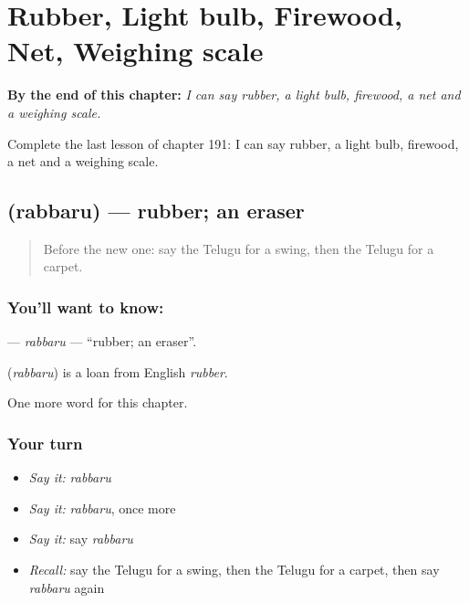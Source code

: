 
\chapter{Rubber, Light bulb, Firewood, Net, Weighing scale}
\label{ch:te-rubber-light-bulb-firewood-net-weighing-scale}

\begin{chapteropening}
\textbf{By the end of this chapter:} \emph{I can say rubber, a light bulb, firewood, a net and a weighing scale.}

Complete the last lesson of chapter 191: I can say rubber, a light bulb, firewood, a net and a weighing scale.
\end{chapteropening}

\section[\texorpdfstring{\te{రబ్బరు} (rabbaru)}{రబ్బరు (rabbaru)}]{ (rabbaru) — rubber; an eraser}

\label{lesson:TE-C191-rabbaru}



\begin{quote}
Before the new one: say the Telugu for a swing, then the Telugu for a carpet.
\end{quote}

\subsection*{You'll want to know: }
\textbf{} — \emph{rabbaru} — \textquotedblleft{}rubber; an eraser\textquotedblright{}.

\begin{cousinweb}
\textbf{} (\emph{rabbaru}) is a loan from English \emph{rubber}.
\end{cousinweb}

\begin{grammarlens}[title={What you've built}]
One more word for this chapter.
\end{grammarlens}

\subsection*{Your turn}
\begin{itemize}
\raggedright
  \item \emph{Say it:} \emph{rabbaru}
  \item \emph{Say it:} \emph{rabbaru}, once more
  \item \emph{Say it:} say \emph{rabbaru}
  \item \emph{Recall:} say the Telugu for a swing, then the Telugu for a carpet, then say \emph{rabbaru} again
\end{itemize}

